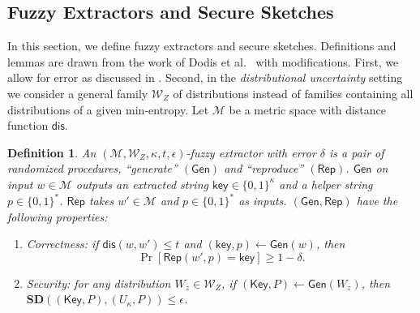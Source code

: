 \documentclass[11pt]{article}
\newtheorem{definition}[theorem]{Definition}
\newcommand{\secref}[1]{\mbox{Section~\ref{#1}}}
\newcommand{\class}[1]{{\ensuremath{\mathsf{#1}}}}
\newcommand{\key}{\ensuremath{\class{key}}\xspace}
\newcommand{\Key}{\ensuremath{\class{Key}}\xspace}
\newcommand{\gen}{\ensuremath{\class{Gen}}\xspace}
\newcommand{\rep}{\ensuremath{\class{Rep}}\xspace}
\newcommand{\dis}{\ensuremath{\mathsf{dis}}}
\newcommand{\sd}{\ensuremath{\mathbf{SD}}}
\begin{document}
\subsection{Fuzzy Extractors and Secure Sketches}\label{sec:fuzz extractor}

In this section, we define fuzzy extractors and secure sketches.  Definitions and lemmas are drawn from the work of Dodis et al.~\cite[Sections 2.5--4.1]{DBLP:journals/siamcomp/DodisORS08} with modifications.  First, we allow for error as discussed in \cite[Section 8]{DBLP:journals/siamcomp/DodisORS08}.  Second, in the \emph{distributional uncertainty} setting we consider a general family $\mathcal{W}_Z$ of distributions instead of families containing all distributions of a given min-entropy.
Let $\mathcal{M}$ be a metric space with distance function $\dis$.

\begin{definition}
\label{def:fuzzy extractor}
An $(\mathcal{M}, \mathcal{W}_Z, \kappa, t, \epsilon)$-\emph{fuzzy extractor} with error $\delta$ is a pair of randomized procedures, ``generate'' $(\gen)$ and ``reproduce'' $(\rep)$. \gen on input $w\in \mathcal{M}$ outputs an extracted string $\key \in\{0,1\}^\kappa$ and a helper string $p\in\{0,1\}^*$. \rep takes $w'\in\mathcal{M}$ and $p\in\{0,1\}^*$ as inputs.   $(\gen, \rep)$ have the following properties:
\begin{enumerate}
\item \emph{Correctness:} if $\dis(w, w')\leq t$ and $(\key, p)\leftarrow \gen(w)$, then 
\[\Pr[\rep(w', p) = \key] \geq 1-\delta.\]
\item \emph{Security:} for any distribution $W_z\in\mathcal{W}_Z$, if $(\Key,P)\leftarrow\gen (W_z)$, then $\sd((\Key,P),(U_\kappa,P))\leq \epsilon$.
\end{enumerate}
\end{definition}
\end{document}
